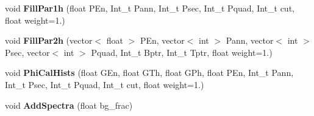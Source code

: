 \begin{DoxyCompactItemize}
\item 
\hypertarget{classhists_a618651882b77d410480e624dfd4b8ee4}{void {\bfseries Fill\-Par1h} (float P\-En, Int\-\_\-t Pann, Int\-\_\-t Psec, Int\-\_\-t Pquad, Int\-\_\-t cut, float weight=1.)}\label{classhists_a618651882b77d410480e624dfd4b8ee4}

\item 
\hypertarget{classhists_abdb2e69023e9fdd9080bcef611c26125}{void {\bfseries Fill\-Par2h} (vector$<$ float $>$ P\-En, vector$<$ int $>$ Pann, vector$<$ int $>$ Psec, vector$<$ int $>$ Pquad, Int\-\_\-t Bptr, Int\-\_\-t Tptr, float weight=1.)}\label{classhists_abdb2e69023e9fdd9080bcef611c26125}

\item 
\hypertarget{classhists_ab48ef7120a82723ec1db8fde8143d532}{void {\bfseries Phi\-Cal\-Hists} (float G\-En, float G\-Th, float G\-Ph, float P\-En, Int\-\_\-t Pann, Int\-\_\-t Psec, Int\-\_\-t Pquad, Int\-\_\-t cut, float weight=1.)}\label{classhists_ab48ef7120a82723ec1db8fde8143d532}

\item 
\hypertarget{classhists_a52b2233e6775d4a9bf714368101116cb}{void {\bfseries Add\-Spectra} (float bg\-\_\-frac)}\label{classhists_a52b2233e6775d4a9bf714368101116cb}

\end{DoxyCompactItemize}
